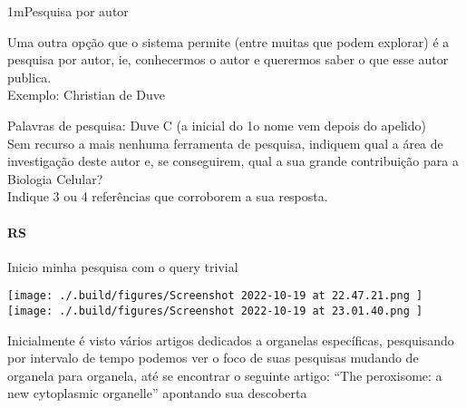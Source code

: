 \documentclass[\mainfilename]{subfiles}
\begin{document}
\begin{questionBox}1m{Pesquisa por autor} %
    
    Uma outra opção que o sistema permite (entre muitas que podem explorar) é a pesquisa por autor, ie, conhecermos o autor e querermos saber o que esse autor publica.\\

    Exemplo: Christian de Duve

    Palavras de pesquisa: Duve C (a inicial do 1o nome vem depois do apelido)\\

    Sem recurso a mais nenhuma ferramenta de pesquisa, indiquem qual a área de investigação deste autor e, se conseguirem, qual a sua grande contribuição para a Biologia Celular?\\

    Indique 3 ou 4 referências que corroborem a sua resposta.\\


    \paragraph{RS} Inicio minha pesquisa com o query trivial
    \begin{center}
            \texttt{[image: 
                ./.build/figures/Screenshot 2022-10-19 at 22.47.21.png
            ]}
            \texttt{[image: 
                ./.build/figures/Screenshot 2022-10-19 at 23.01.40.png
            ]}
    \end{center}
    \cite{r4,r5,r6}

    Inicialmente é visto vários artigos dedicados a organelas específicas, pesquisando por intervalo de tempo podemos ver o foco de suas pesquisas mudando de organela para organela, até se encontrar o seguinte artigo: ``The peroxisome: a new cytoplasmic organelle'' \cite{r3} apontando sua descoberta
    
\end{questionBox}



\end{document}
